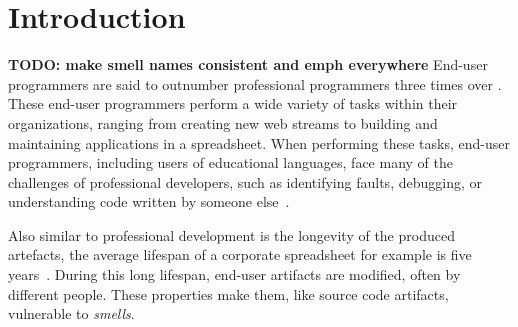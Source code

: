 \documentclass{sig-alternate}
\newcommand{\todo}[1]{\textbf{TODO: #1}}
\newcommand{\ms}{LEGO MINDSTORMS EV3}
\begin{document}
\begin{abstract}
Millions of people in the workforce today program, without degrees or professional training in software development. These end-user programmers perform a variety of tasks, from combining web information to building models to support business decisions. Software engineering research into code smells has traditionally focused on professionally used object-oriented programming languages, yet these end-user domains and languages also suffer from code smells. 

In this work, we explore recent research in two distinct end-user domains and languages: spreadsheets in Microsoft Excel and web mashups in Yahoo Pipes. Based on existing OO-smells and their applications to these two end-user domains, we distill a catalog of generic end-user smells. 
We demonstrate the broad applicability of the catalog by mapping the smells to two additional end-user languages not previously targeted by smell detection and refactoring research, both aimed at education: \ms~and Microsoft's Kodu. The results of this application show that  OO inspired smells indeed occur in educational end-user languages and are present in 88\% and 93\% of the EV3 and Kodu programs, respectively. Most commonly we find that programs are plagued with lazy class, duplication, and dead code smells, with duplication smells being present in nearly 2/3 of programs in each language. We conclude the paper by proposing new end-user smells inspired by the educational languages, moving beyond the OO paradigm. 
\end{abstract}


\section{Introduction}
\todo{make smell names consistent and emph everywhere}
End-user programmers are said to outnumber  professional programmers three times over \cite{Scaf2005}.
These end-user programmers perform a wide variety of tasks within their organizations, ranging from creating new web streams to building and maintaining applications in a spreadsheet. When performing these tasks, end-user programmers, including users of educational languages,  face many of the challenges of professional developers, such as identifying faults, debugging, or understanding code written by someone else~\cite{Ko2011}. 

Also similar to professional development is the longevity of the produced artefacts, the average lifespan of a corporate spreadsheet for example is five years~\cite{Hermans2011}. During this long lifespan, end-user artifacts are modified, often by different people.
These properties make them, like source code artifacts, vulnerable to \emph{smells}. 
\end{document}
